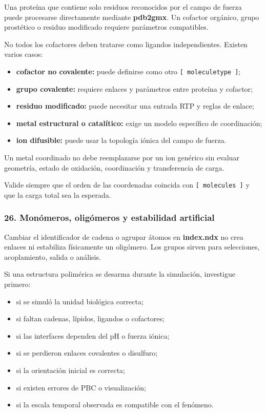 \documentclass[
  spanish,
  11pt,
  a4paper]{article}
\providecommand{\tightlist}{%
  \setlength{\itemsep}{0pt}\setlength{\parskip}{0pt}}
\begin{document}
Una proteína que contiene solo residuos reconocidos por el campo de
fuerza puede procesarse directamente mediante \textbf{pdb2gmx}. Un
cofactor orgánico, grupo prostético o residuo modificado requiere
parámetros compatibles.

No todos los cofactores deben tratarse como ligandos independientes.
Existen varios casos:

\begin{itemize}
\tightlist
\item
  \textbf{cofactor no covalente:} puede definirse como otro
  \texttt{{[}\ moleculetype\ {]}};
\item
  \textbf{grupo covalente:} requiere enlaces y parámetros entre proteína
  y cofactor;
\item
  \textbf{residuo modificado:} puede necesitar una entrada RTP y reglas
  de enlace;
\item
  \textbf{metal estructural o catalítico:} exige un modelo específico de
  coordinación;
\item
  \textbf{ion difusible:} puede usar la topología iónica del campo de
  fuerza.
\end{itemize}

Un metal coordinado no debe reemplazarse por un ion genérico sin evaluar
geometría, estado de oxidación, coordinación y transferencia de carga.

Valide siempre que el orden de las coordenadas coincida con
\texttt{{[}\ molecules\ {]}} y que la carga total sea la esperada.

\subsubsection{26. Monómeros, oligómeros y estabilidad
artificial}\label{monuxf3meros-oliguxf3meros-y-estabilidad-artificial}

Cambiar el identificador de cadena o agrupar átomos en
\textbf{index.ndx} no crea enlaces ni estabiliza físicamente un
oligómero. Los grupos sirven para selecciones, acoplamiento, salida o
análisis.

Si una estructura polimérica se desarma durante la simulación,
investigue primero:

\begin{itemize}
\tightlist
\item
  si se simuló la unidad biológica correcta;
\item
  si faltan cadenas, lípidos, ligandos o cofactores;
\item
  si las interfaces dependen del pH o fuerza iónica;
\item
  si se perdieron enlaces covalentes o disulfuro;
\item
  si la orientación inicial es correcta;
\item
  si existen errores de PBC o visualización;
\item
  si la escala temporal observada es compatible con el fenómeno.
\end{itemize}
\end{document}
